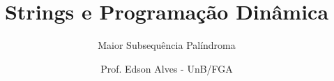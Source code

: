 \title{Strings e Programação Dinâmica}
\subtitle{Maior Subsequência Palíndroma}
\author{Prof. Edson Alves - UnB/FGA}
\date{}
